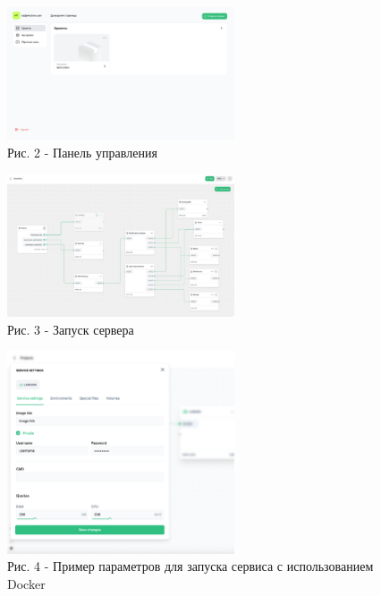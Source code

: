 \begin{figure}[H]
	\centering
	\includegraphics[width=0.6\textwidth]{media/ict/image19}
	\caption*{Рис. 2 - Панель управления}
\end{figure}

\begin{figure}[H]
	\centering
	\includegraphics[width=0.6\textwidth]{media/ict/image20}
	\caption*{Рис. 3 - Запуск сервера}
\end{figure}

\begin{figure}[H]
	\centering
	\includegraphics[width=0.6\textwidth]{media/ict/image21}
	\caption*{Рис. 4 - Пример параметров для запуска сервиса с использованием Docker}
\end{figure}

